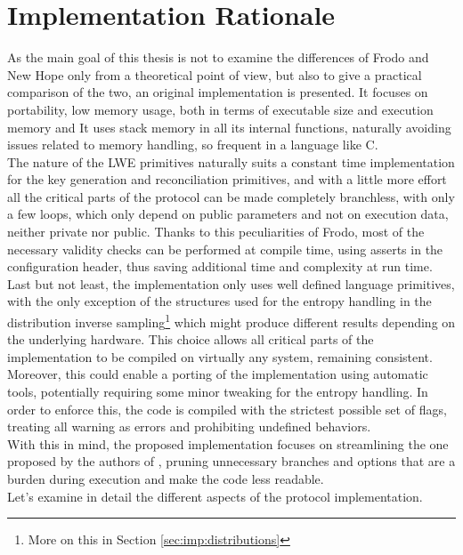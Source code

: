\section{Implementation Rationale}
As the main goal of this thesis is not to examine the differences of Frodo and New Hope only from a theoretical point of view, but also to give a practical comparison of the two, an original implementation is presented. It focuses on portability, low memory usage, both in terms of executable size and execution memory and It uses stack memory in all its internal functions, naturally avoiding issues related to memory handling, so frequent in a language like C.\\
The nature of the LWE primitives naturally suits a constant time implementation for the key generation and reconciliation primitives, and with a little more effort all the critical parts of the protocol can be made completely branchless, with only a few loops, which only depend on public parameters and not on execution data, neither private nor public. Thanks to this peculiarities of Frodo, most of the necessary validity checks can be performed at compile time, using asserts in the configuration header, thus saving additional time and complexity at run time.\\
Last but not least, the implementation only uses well defined language primitives, with the only exception of the structures used for the entropy handling in the distribution inverse sampling\footnote{More on this in Section \ref{sec:imp:distributions}} which might produce different results depending on the underlying hardware. This choice allows all critical parts of the implementation to be compiled on virtually any system, remaining consistent. Moreover, this could enable a porting of the implementation using automatic tools, potentially requiring some minor tweaking for the entropy handling. In order to enforce this, the code is compiled with the strictest possible set of flags, treating all warning as errors and prohibiting undefined behaviors.\\
With this in mind, the proposed implementation focuses on streamlining the one proposed by the authors of \cite{frodo}, pruning unnecessary branches and options that are a burden during execution and make the code less readable.\\
Let's examine in detail the different aspects of the protocol implementation.

